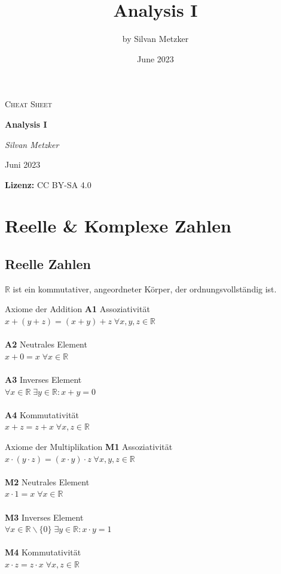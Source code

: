 \documentclass[a4paper,10pt]{article}
\title{Analysis I}
\author{by Silvan Metzker}
\date{June 2023}
\def\R{\mathbb{R}}
\begin{document}
\setlength{\abovedisplayskip}{3pt}
\setlength{\belowdisplayskip}{3pt}
\setlength{\abovedisplayshortskip}{3pt}
\setlength{\belowdisplayshortskip}{3pt}

\begin{center}
	\vspace{1cm}
	{\Large \textsc{Cheat Sheet}\par}
	{\huge\bfseries Analysis I\par}
	\vspace{0.5cm}
	{\Large\itshape Silvan Metzker\par}
	{\large Juni 2023\par}
	\vspace{0.4cm}
	{\textbf{Lizenz:} CC BY-SA 4.0}
\end{center}

\section{Reelle \& Komplexe Zahlen}
\subsection{Reelle Zahlen}
$\R$ ist ein kommutativer, angeordneter Körper, der ordnungsvollständig ist.

\begin{mainbox}{Axiome der Addition}
	\textbf{A1} Assoziativität \\$x + (y + z) = (x + y) + z \; \forall x,y,z \in \R$ \\ \\
	\textbf{A2} Neutrales Element \\$x + 0 = x \; \forall x \in \R$ \\ \\
	\textbf{A3} Inverses Element \\$\forall x \in \R \; \exists y \in \R : x + y = 0$ \\ \\
	\textbf{A4} Kommutativität \\$x + z = z + x \; \forall x, z \in \R$
\end{mainbox}

\begin{mainbox}{Axiome der Multiplikation}
	\textbf{M1} Assoziativität\\ $x \cdot (y \cdot z) = (x \cdot y) \cdot z \; \forall x,y,z \in \R$\\\\
	\textbf{M2} Neutrales Element\\ $x \cdot 1 = x \; \forall x \in \R$ \\\\
	\textbf{M3} Inverses Element\\ $\forall x \in \R \backslash \{0\} \; \exists y \in \R : x \cdot y = 1$ \\\\
	\textbf{M4} Kommutativität\\ $x \cdot z = z \cdot x \; \forall x, z \in \R$
\end{mainbox}
\end{document}
